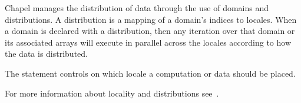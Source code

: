 Chapel manages the distribution of data through the use of domains
and distributions.  A distribution is a mapping of a domain's indices to 
locales.  When a domain is declared with a distribution, then any iteration
over that domain or its associated arrays will execute in parallel across the 
locales according to how the data is distributed.

The  statement controls on which locale a computation or data
should be placed.

For more information about locality and distributions 
see~.

